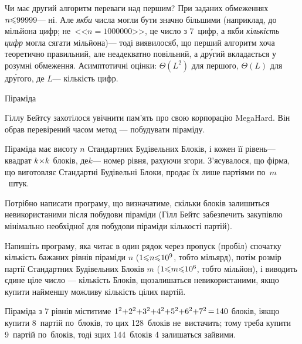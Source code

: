 \documentclass[14pt,a4paper]{extarticle}
\def\dib#1{\,#1\discretionary{}{\mbox{$#1$}}{}\,}
\begin{document}
\myhrulefill

Чи має другий алгоритм переваги над першим? При заданих обмеженнях ${n{\leqslant}99999}$\nolinebreak[3] --- ні. Але \emph{якби} числа могли бути значно більшими (наприклад, до мільйона цифр; не~<<$n{=}1000000$>>, це число з 7~цифр, а якби \emph{кількість цифр} могла сягати мільйона)\nolinebreak[3] --- тоді виявилося\nolinebreak[3] б, що перший алгоритм хоча теоретично правильний, але неадекватно повільний, а др\'{у}гий вкладається у розумні обмеження. Асимптотичні оцінки: $\Theta(L^2)$ для першого, $\Theta(L)$ для др\'{у}гого, де $L$\nolinebreak[3] --- кількість цифр.



\begin{problemAllDefault}{Піраміда}

Гіллу Бейтсу захотілося увічнити пам'ять про свою корпорацію MegaHard. Він обрав перевірений часом метод --- побудувати піраміду.

Піраміда має висоту $n$ Стандартних Будівельних Блоків, і кожен її рівень\nolinebreak[3] --- квадрат $k{\times}k$ блоків, де\nolinebreak[3] $k$\nolinebreak[3] --- номер рівня, рахуючи згори. З'ясувалося, що фірма, що виготовляє Стандартні Будівельні Блоки, продає їх лише партіями по~$m$~штук.

{

Потрібно написати програму, що визначатиме, скільки блоків залишиться не\nolinebreak[3] використаними після побудови піраміди (Гілл Бейтс забезпечить закупівлю мінімально необхідної для побудови піраміди кількості партій).

Напишіть програму, яка читає в один рядок через пропуск (пробіл) спочатку кількість бажаних рівнів піраміди $n$ ($1{\leqslant}n{\leqslant}10^9$, тобто мільярд), потім розмір партії Стандартних Будівельних Блоків $m$ ($1{\leqslant}m{\leqslant}10^6$, тобто мільйон), і виводить єдине ціле число --- кількість Блоків, що\nolinebreak[3] залишаться не\nolinebreak[3] використаними, якщо купити найменшу можливу кількість цілих партій.

}

\Example
\begin{exampleSimple}{4em}{4em}%
%
\end{exampleSimple}

\Note
Піраміда з 7 рівнів міститиме %
$1^2{+}2^2{+}3^2{+}4^2{+}5^2{+}6^2{+}7^2\dib{{=}}140$
блоків, і\nolinebreak[3] якщо купити 8~партій по~блоків, то цих 128~блоків не~вистачить; тому треба купити 9~партій по~блоків, тоді з\nolinebreak[3] цих 144~блоків 4 залишаться зайвими.


\end{problemAllDefault}
	
\end{document}
